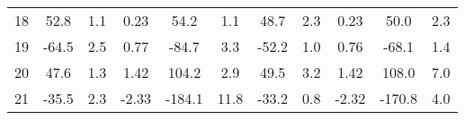 \begin{tabular}{rSSSSSSSSSS}
        18 &                52.8 &                          1.1 &     0.23 &              54.2 &                      1.1 &                       48.7 &                                 2.3 &            0.23 &                     50.0 &                               2.3 \\
        19 &               -64.5 &                          2.5 &     0.77 &             -84.7 &                      3.3 &                      -52.2 &                                 1.0 &            0.76 &                    -68.1 &                               1.4 \\
        20 &                47.6 &                          1.3 &     1.42 &             104.2 &                      2.9 &                       49.5 &                                 3.2 &            1.42 &                    108.0 &                               7.0 \\
        21 &               -35.5 &                          2.3 &    -2.33 &            -184.1 &                     11.8 &                      -33.2 &                                 0.8 &           -2.32 &                   -170.8 &                               4.0 \\
\bottomrule
\end{tabular}
